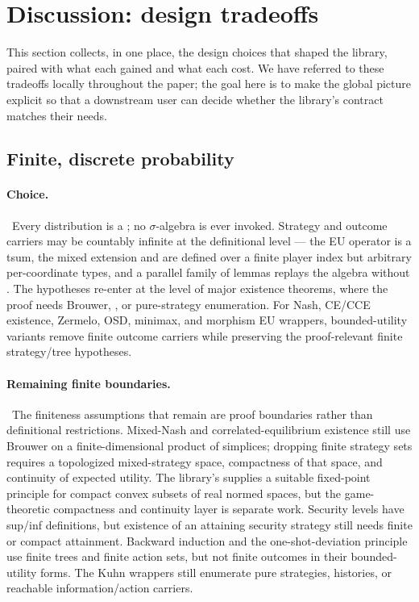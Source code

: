 \section{Discussion: design tradeoffs}
\label{sec:discussion}

This section collects, in one place, the design choices that
shaped the library, paired with what each gained and what each
cost.  We have referred to these tradeoffs locally throughout the
paper; the goal here is to make the global picture explicit so
that a downstream user can decide whether the library's contract
matches their needs.

\subsection{Finite, discrete probability}
\label{sec:discussion:finite}

\paragraph{Choice.}\ Every distribution is a ; no
$\sigma$-algebra is ever invoked.  Strategy and outcome carriers
may be countably infinite at the definitional level — the EU
operator is a tsum, the mixed extension and  are
defined over a finite player index but arbitrary per-coordinate
types, and a parallel family of  lemmas
replays the algebra without .  The
 hypotheses re-enter at the level of major existence
theorems, where the proof needs Brouwer, ,
or pure-strategy enumeration.  For Nash, CE/CCE existence, Zermelo,
OSD, minimax, and morphism EU wrappers, bounded-utility variants
remove finite outcome carriers while preserving the proof-relevant
finite strategy/tree hypotheses.

\paragraph{Remaining finite boundaries.}\ The finiteness assumptions
that remain are proof boundaries rather than definitional restrictions.
Mixed-Nash and correlated-equilibrium existence still use Brouwer on a
finite-dimensional product of simplices; dropping finite strategy
sets requires a topologized mixed-strategy space, compactness of
that space, and continuity of expected utility.  The library's
 supplies a suitable
fixed-point principle for compact convex subsets of real normed
spaces, but the game-theoretic compactness and continuity layer is
separate work.
Security levels have sup/inf definitions, but existence of an
attaining security strategy still needs finite or compact attainment.
Backward induction and the one-shot-deviation principle use finite
trees and finite action sets, but not finite outcomes in their
bounded-utility forms.  The Kuhn wrappers still enumerate pure
strategies, histories, or reachable information/action carriers.

